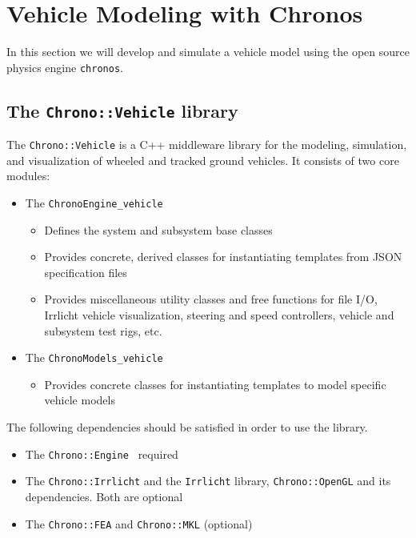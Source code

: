 \section{Vehicle Modeling with Chronos}
\label{vehicle_modeling_chronos}

In this section we will develop and simulate a vehicle model using the open source physics engine \lstinline{chronos}. 


\subsection{The \lstinline{Chrono::Vehicle} library}

The \lstinline{Chrono::Vehicle} is a C++ middleware library for the modeling, simulation, and visualization of wheeled and tracked ground vehicles.
It consists of two core modules:

\begin{itemize}
\item The \lstinline{ChronoEngine_vehicle}

	\begin{itemize}
		\item Defines the system and subsystem base classes
		\item Provides concrete, derived classes for instantiating templates from JSON specification files
		\item Provides miscellaneous utility classes and free functions for file I/O, Irrlicht vehicle visualization, steering and speed controllers, vehicle and subsystem test rigs, etc.
	\end{itemize}

\item The \lstinline{ChronoModels_vehicle}
	\begin{itemize}
		\item Provides concrete classes for instantiating templates to model specific vehicle models
	\end{itemize}
\end{itemize}

The following dependencies should be satisfied in order to use the library.

\begin{itemize}
\item The \lstinline{Chrono::Engine } required
\item The \lstinline{Chrono::Irrlicht} and the \lstinline{Irrlicht} library,  \lstinline{Chrono::OpenGL} and its dependencies. Both are optional
\item The \lstinline{Chrono::FEA} and \lstinline{Chrono::MKL} (optional)
\end{itemize}

